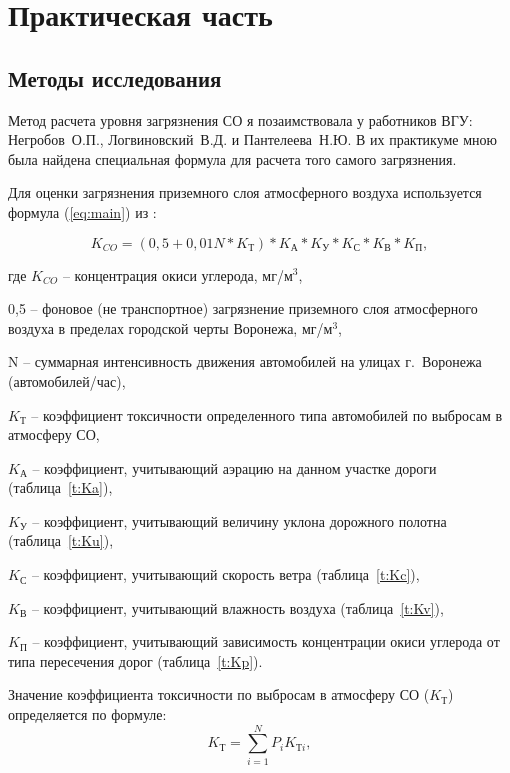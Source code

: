 

\section{Практическая часть}

\subsection{Методы исследования}

Метод расчета уровня загрязнения СО я позаимствовала у работников ВГУ: Негробов~О.П., Логвиновский~В.Д. и Пантелеева~Н.Ю. В их практикуме мною была найдена специальная формула для расчета того самого загрязнения.

Для оценки загрязнения приземного слоя атмосферного воздуха используется формула (\ref{eq:main}) из \cite{begma}:

\begin{equation}
K_{CO} = (0,5 + 0,01N * K_{\text{Т}}) * K_{\text{А}} * K_{\text{У}} * K_{\text{С}} * K_{\text{В}} * K_{\text{П}},
\label{eq:main}
\end{equation}

\par где $K_{CO}$ – концентрация окиси углерода, мг/м$^3$,
\par 0,5 – фоновое (не транспортное) загрязнение приземного слоя атмосферного воздуха в пределах городской черты Воронежа, мг/м$^3$,
\par N – суммарная интенсивность движения автомобилей на улицах г.~Воронежа (автомобилей/час),
\par $K_{\text{Т}}$ – коэффициент токсичности определенного типа автомобилей по выбросам в атмосферу СО,
\par $K_{\text{А}}$ – коэффициент, учитывающий аэрацию на данном участке дороги (таблица~\ref{t:Ka}),
\par $K_{\text{У}}$ – коэффициент, учитывающий величину уклона дорожного полотна (таблица~\ref{t:Ku}),
\par $K_{\text{С}}$ – коэффициент, учитывающий скорость ветра (таблица~\ref{t:Kc}),
\par $K_{\text{В}}$ – коэффициент, учитывающий влажность воздуха (таблица~\ref{t:Kv}),
\par $K_{\text{П}}$ – коэффициент, учитывающий зависимость концентрации окиси углерода от типа пересечения дорог (таблица~\ref{t:Kp}).


Значение коэффициента токсичности по выбросам в атмосферу СО ($K_{\text{Т}}$) определяется по формуле:
\begin{equation}
K_{\text{Т}} = \sum_{i=1}^{N}P_{i}K_{\text{Т}i},
\label{eq:Kt}
\end{equation}

